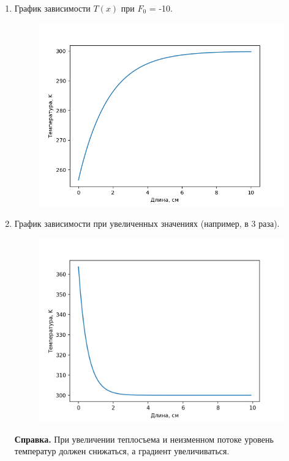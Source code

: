 \begin{enumerate}
\item График зависимости $T(x)$ при $F_0$ = -10.
\begin{figure}[H]
    \centering
    \includegraphics[scale=0.9]{data/pdf/Figure_2.png}
\end{figure}

\item График зависимости  при увеличенных значениях (например, в 3 раза).
\begin{figure}[H]
    \centering
    \includegraphics[scale=0.9]{data/pdf/graph3.png}
\end{figure}
\textbf{Справка.}
При увеличении теплосъема и неизменном потоке  уровень температур  должен снижаться, а градиент увеличиваться.


\end{enumerate}
